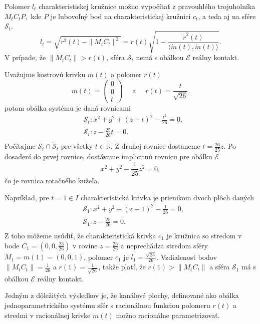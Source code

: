 Polomer $l_t$ charakteristiskej kružnice  možno vypočítať z pravouhlého trojuholníka $M_tC_tP,$ kde $P$ je ľubovoľný bod na charakteristickej kružnici $c_t$, a teda aj na sfére $\mathcal{S}_t.$
$$ l_t = \sqrt{r^2(t) - \|M_tC_t\|^2} = r(t) \sqrt{ 1 - \frac{\dot{r}^2(t)}{\langle \dot{m}(t), \dot{m}(t) \rangle}}. $$
V prípade, že $ \|M_tC_t\| > r(t)$, sféra $\mathcal{S}_t$ nemá s obálkou $\mathcal{E}$ reálny kontakt. 

\begin{example}
Uvažujme kostrovú krivku $m(t)$ a polomer $r(t)$
$$ 
m(t) = \begin{pmatrix} 0 \\ 0 \\ t \end{pmatrix} \quad \text{ a } \quad r(t) = \frac{t}{\sqrt{26}}.
$$
potom obálka systému je daná rovnicami
\begin{align*}
&\mathcal{S}_t \colon x^2 + y^2 + (z - t)^2 - \frac{t^2}{26} = 0, \\
&\mathcal{\dot{S}}_t \colon z - \frac{25}{26}t = 0. \\
\end{align*}
Počítajme $ \mathcal{S}_t \cap \mathcal{\dot{S}}_t $ pre všetky $t \in \mathbb{R}.$ Z druhej rovnice dostaneme $t = \frac{26}{25}z$. Po dosadení do prvej rovnice, dostávame implicitnú rovnicu pre obálku $\mathcal{E}$
$$
x^2 + y^2 - \frac{1}{25}z^2 = 0,
$$
čo je rovnica rotačného kužeľa.

Napríklad, pre $t = 1 \in I$ charakteristická krivka je prienikom dvoch plôch daných
\begin{align*}
&\mathcal{S}_1 \colon x^2 + y^2 + (z - 1)^2 - \frac{1}{26} = 0, \\
&\mathcal{\dot{S}}_1 \colon z - \frac{25}{26} = 0. \\
\end{align*}
Z toho môžeme usúdiť, že charakteristická krivka $c_1$ je kružnica so stredom v bode $C_1 = (0, 0, \frac{25}{26})$ v rovine $z = \frac{25}{26}$ a neprechádza stredom sféry $M_1 = m(1) = (0,0,1)$, polomer $c_1$ je $l_{1} = \frac{\sqrt{25}}{26}$. Vzdialenosť bodov $ \|M_tC_t\| = \frac{1}{26}$ a $r(1)= \frac{1}{\sqrt{26}}$, takže platí, že $r(1) > \|M_tC_t\|$ a sféra $\mathcal{S}_1$ má s obálkou $\mathcal{E}$ reálny kontakt.
\end{example}

Jedným z dôležitých výsledkov je, že kanálové plochy, definované ako obálka jednoparametrického systému sfér s racionálnou funkciou polomeru $r(t)$ a stredmi v racionálnej krivke $m(t)$ možno racionálne parametrizovať. \cite{Pet97}

